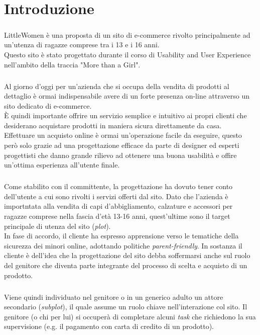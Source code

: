 \documentclass[12pt,a4paper]{report}
\begin{document}
\chapter{Introduzione}
\paragraph{} LittleWomen è una proposta di un sito di e-commerce rivolto principalmente ad un'utenza di ragazze comprese tra i 13 e i 16 anni.\\Questo sito è stato progettato durante il corso di Usability and User Experience nell'ambito della traccia "More than a Girl".
\paragraph{} Al giorno d'oggi per un'azienda che si occupa della vendita di prodotti al dettaglio è ormai indispensabile avere di un forte presenza on-line attraverso un sito dedicato di e-commerce.\\
È quindi importante offrire un servizio semplice e intuitivo ai propri clienti che desiderano acquistare prodotti in maniera sicura direttamente da casa.\\
Effettuare un acquisto online è ormai un'operazione facile da eseguire, questo però solo grazie ad una progettazione efficace da parte di designer ed esperti progettisti che danno grande rilievo ad ottenere una buona usabilità e offire un'ottima esperienza all'utente finale.
\paragraph{} Come stabilito con il committente, la progettazione ha dovuto tener conto dell'utente a cui sono rivolti i servizi offerti dal sito. Dato che l'azienda è importntata alla vendita di capi d'abbigliamento, calzature e accessori per ragazze comprese nella fascia d'età 13-16 anni, quest'ultime sono il target principale di utenza del sito (\textit{plot}).\\
In fase di accordo, il cliente ha espresso apprensione verso le tematiche della sicurezza dei minori online, adottando politiche \textit{parent-friendly}. In sostanza il cliente è dell'idea che la progettazione del sito debba soffermarsi anche sul ruolo del genitore che diventa parte integrante del processo di scelta e acquisto di un prodotto.
\paragraph{}Viene quindi individuato nel genitore o in un generico adulto un attore secondario (\textit{subplot}), il quale assume un ruolo chiave nell'interazione col sito.
Il genitore (o chi per lui) si occuperà di completare alcuni \textit{task} che richiedono la sua supervisione (e.g. il pagamento con carta di credito di un prodotto).\\
\end{document}
